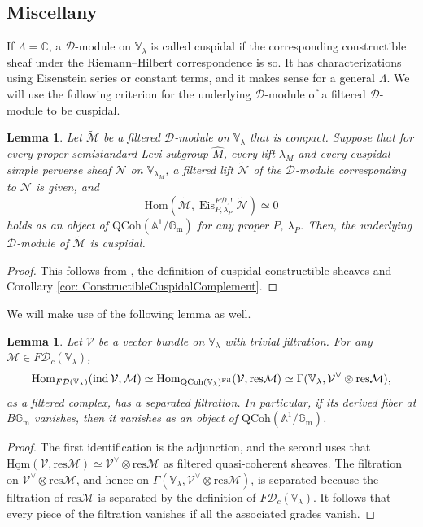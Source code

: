 \documentclass{amsart}
\newtheorem{lemma}[theorem]{Lemma}
\theoremstyle{definition}
\theoremstyle{remark}
\numberwithin{equation}{section}
\DeclareMathOperator{\ind}{\mathrm{ind}}
\newcommand{\mc}{\mathcal}
\newcommand{\A}{\mathbb{A}}
\newcommand{\C}{\mathbb{C}}
\newcommand{\Gm}{{\mathbb{G}_{\mathrm{m}}}}
\newcommand{\Hom}{\mathrm{Hom}}
\newcommand{\wh}{\widehat}
\newcommand{\res}{\mathrm{res}}
\newcommand{\QCoh}{\mathrm{QCoh}}
\DeclareMathOperator{\Eis}{\mathrm{Eis}}
\newcommand{\V}{\mathbb{V}}
\begin{document}
\subsection{Miscellany}
If $\Lambda=\C$, a $\mc D$-module on $\V_\lambda$ is called cuspidal if the corresponding constructible sheaf under the Riemann--Hilbert correspondence is so. It has characterizations using Eisenstein series or constant terms, and it makes sense for a general $\Lambda$. We will use the following criterion for the underlying $\mc D$-module of a filtered $\mc D$-module to be cuspidal. 

\begin{lemma}{\label{lem: filteredcusplem}}
Let $\widetilde{\mc M}$ be a filtered $\mc D$-module on $\V_{\lambda}$ that is compact. Suppose that for every proper semistandard Levi subgroup $\wh M$, every lift $\lambda_M$ and every cuspidal simple perverse sheaf $\mc N$ on $\V_{\lambda_M}$, a filtered lift $\widetilde{\mc N}$ of the $\mc D$-module corresponding to $\mc{N}$ is given, and 
\[
\Hom (\widetilde{\mc M}, \Eis_{P,\lambda_P}^{F\mc D, !} \widetilde{\mc N})\simeq 0
\]
holds as an object of $\QCoh (\A^1 /\Gm)$ for any proper $P$, $\lambda_P$. Then, the underlying $\mc D$-module of $\widetilde{\mc M}$ is cuspidal. 
\end{lemma}

\begin{proof}
This follows from \cite[Proposition 3.3.16]{Chen2023categorical}, the definition of cuspidal constructible sheaves and Corollary \ref{cor: ConstructibleCuspidalComplement}. 
\end{proof}

We will make use of the following lemma as well.

\begin{lemma}{\label{lem: Dmodulehomequality}}
Let $\mc V$ be a vector bundle on $\V_{\lambda}$ with trivial filtration. For any $\mc M\in F\mc{D}_c(\V_{\lambda})$, 
\[
\Hom_{F\mc{D}(\V_{\lambda})} (\ind \mc V, \mc M)\simeq \Hom_{\QCoh(\V_{\lambda})^{\textnormal{Fil}}} (\mc V, \res \mc M)\simeq \Gamma (\V_{\lambda}, \mc V^{\vee}\otimes \res \mc M),
\]
as a filtered complex, has a separated filtration. In particular, if its derived fiber at $B\Gm$ vanishes, then it vanishes as an object of $\QCoh (\A^1 /\Gm)$. 
\end{lemma}
\begin{proof}
The first identification is the adjunction, and the second uses that $\underline{\mathrm{Hom}} (\mc V, \res \mc M)\simeq \mc V^\vee \otimes \res \mc M$ as filtered quasi-coherent sheaves. The filtration on $\mc V^{\vee}\otimes \res \mc M$, and hence on $\Gamma (\V_{\lambda}, \mc V^{\vee}\otimes \res \mc M)$, is separated because the filtration of $\res \mc M$ is separated by the definition of $F\mc{D}_c(\V_{\lambda})$. It follows that every piece of the filtration vanishes if all the associated grades vanish. 
\end{proof}
\end{document}
